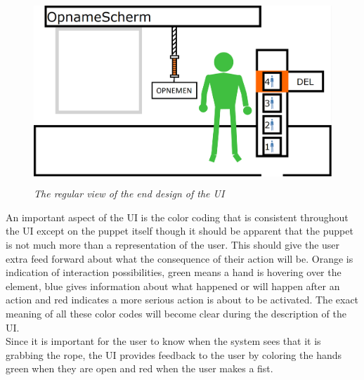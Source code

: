 \begin{figure}[H]
	\begin{center}
		\includegraphics[width=12.5cm, height=7cm]{figures/1_screen_with_user.png}
		\caption{\emph{The regular view of the end design of the UI}}
		\label{regular view end design}
	\end{center}
\end{figure}

An important aspect of the UI is the color coding that is consistent throughout the UI except on the puppet itself though it should be apparent that the puppet is not much more than a representation of the user. This should give the user extra feed forward about what the consequence of their action will be. Orange is indication of interaction possibilities, green means a hand is hovering over the element, blue gives information about what happened or will happen after an action and red indicates a more serious action is about to be activated. The exact meaning of all these color codes will become clear during the description of the UI.\\

Since it is important for the user to know when the system sees that it is grabbing the rope, the UI provides feedback to the user by coloring the hands green when they are open and red when the user makes a fist.\\

